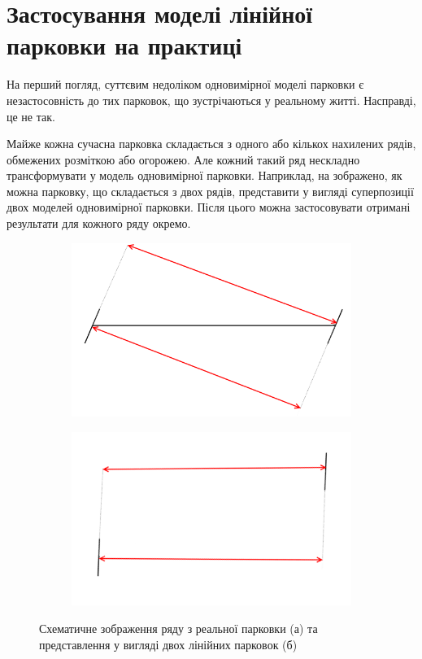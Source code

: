 \section{Застосування моделі лінійної парковки на практиці}

На перший погляд, суттєвим недоліком одновимірної моделі парковки є незастосовність до тих парковок, що зустрічаються у реальному житті. Насправді, це не так.

Майже кожна сучасна парковка складається з одного або кількох нахилених рядів, обмежених розміткою або огорожею. Але кожний такий ряд нескладно трансформувати у модель одновимірної парковки. Наприклад, на  зображено, як можна парковку, що складається з двох рядів, представити у вигляді суперпозиції двох моделей одновимірної парковки. Після цього можна застосовувати отримані результати для кожного ряду окремо.

\begin{figure}[bh]
	\begin{subfigure}[b]{0.49\textwidth}    
		\centering
		\includegraphics[width=1\linewidth]{chapter_Application/img/parking_real}
		\caption{}
	\end{subfigure}
	\begin{subfigure}[b]{0.49\textwidth}    
		\centering
		\includegraphics[width=1\linewidth]{chapter_Application/img/parking_real_transformed}
		\caption{}
	\end{subfigure}
	\caption{Схематичне зображення ряду з реальної парковки (а) та представлення у вигляді двох лінійних парковок (б)}
	\label{fig:model_application}
\end{figure}
